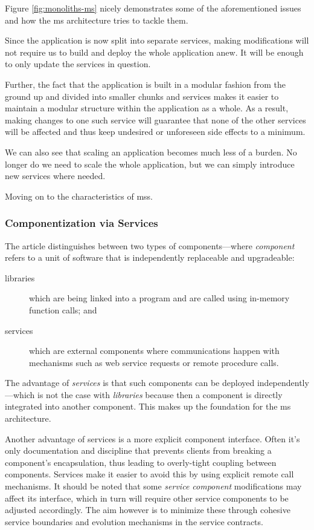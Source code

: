 Figure \ref{fig:monoliths-ms} nicely demonstrates some of the
aforementioned issues and how the \gls{ms} architecture tries to
tackle them.

Since the application is now split into separate services, making
modifications will not require us to build and deploy the whole
application anew. It will be enough to only update the services in
question.

Further, the fact that the application is built in a modular fashion
from the ground up and divided into smaller chunks and services makes
it easier to maintain a modular structure within the application as a
whole. As a result, making changes to one such service will guarantee
that none of the other services will be affected and thus keep
undesired or unforeseen side effects to a minimum.

We can also see that scaling an application becomes much less of a
burden. No longer do we need to scale the whole application, but we
can simply introduce new services where needed.

Moving on to the characteristics of \glspl{ms}.

\subsubsection{Componentization via Services}
\label{sec:componentization}

The article \cite{ms-definition} distinguishes between two types of
components---where \textit{component} refers to a unit of software
that is independently replaceable and upgradeable:

\begin{description}
	\item[libraries] which are being linked into a program and are
		called using in-memory function calls; and
	\item[services] which are external components where communications
		happen with mechanisms such as web service requests or remote
		procedure calls.
\end{description}

The advantage of \textit{services} is that such components can be
deployed independently---which is not the case with \textit{libraries}
because then a component is directly integrated into another
component. This makes up the foundation for the \gls{ms} architecture.

Another advantage of services is a more explicit component interface.
Often it's only documentation and discipline that prevents clients
from breaking a component's encapsulation, thus leading to
overly-tight coupling between components. Services make it easier to
avoid this by using explicit remote call mechanisms.
\cite{ms-definition}
It should be noted that some \textit{service component}
modifications may affect its interface, which in turn will require
other service components to be adjusted accordingly. The aim however
is to minimize these through cohesive service boundaries and evolution
mechanisms in the service contracts. \cite{ms-definition}

